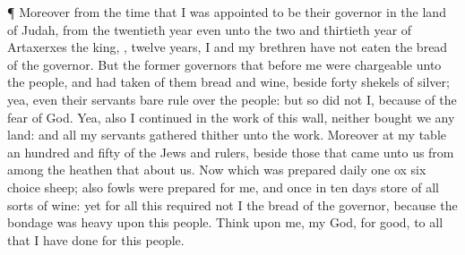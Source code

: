 {\par }{\PP {}¶ Moreover from the
time that I was
appointed to be their
governor in the
land of
Judah, from the
twentieth
year even unto the
two and
thirtieth
year of
Artaxerxes the
king,
{},
twelve
years, I and my
brethren have not
eaten the
bread of the
governor.
But the
former
governors that
{}
before me were
chargeable unto the
people, and had
taken of them
bread and
wine,
beside
forty
shekels of
silver; yea,
even their
servants bare
rule over the
people: but so
did not I,
because of the
fear of
God.
Yea, also I
continued in the
work of this
wall, neither
bought we any
land: and all my
servants
{}
gathered thither unto the
work.
Moreover
{} at my
table an
hundred and
fifty of the
Jews and
rulers, beside those that
came unto us from among the
heathen that
{} about
us.
Now
{} which was
prepared
{}
daily
{}
one
ox
{}
six
choice
sheep; also
fowls were
prepared for me, and once in
ten
days
store of all sorts of
wine: yet for
all this
required not I the
bread of the
governor, because the
bondage was
heavy upon this
people.
Think upon me, my
God, for
good,
{} to all that I have
done for this
people.

}
